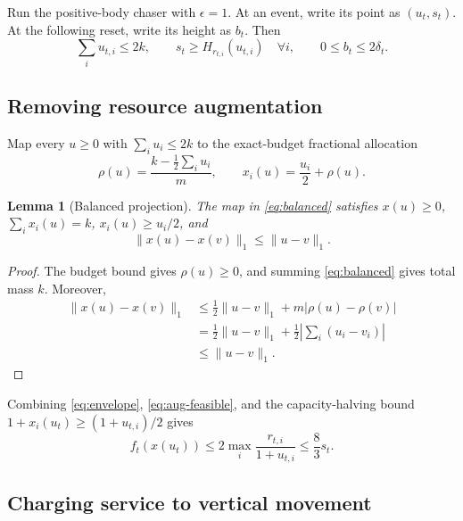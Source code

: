 \documentclass[11pt]{article}
\newtheorem{lemma}[theorem]{Lemma}
\theoremstyle{remark}
\begin{document}
Run the positive-body chaser with $\epsilon=1$.  At an event, write its point
as $(u_t,s_t)$.  At the following reset, write its height as $b_t$.  Then
\begin{equation}\label{eq:aug-feasible}
 \sum_i u_{t,i}\leq2k,\qquad s_t\geq H_{r_{t,i}}(u_{t,i})\quad\forall i,
 \qquad 0\leq b_t\leq2\delta_t.
\end{equation}

\subsection{Removing resource augmentation}

Map every $u\geq0$ with $\sum_i u_i\leq2k$ to the exact-budget fractional
allocation
\begin{equation}\label{eq:balanced}
 \rho(u)=\frac{k-\frac12\sum_i u_i}{m},
 \qquad x_i(u)=\frac{u_i}{2}+\rho(u).
\end{equation}

\begin{lemma}[Balanced projection]\label{lem:balanced}
The map in \eqref{eq:balanced} satisfies $x(u)\geq0$,
$\sum_i x_i(u)=k$, $x_i(u)\geq u_i/2$, and
\[
 \lVert x(u)-x(v)\rVert_1\leq\lVert u-v\rVert_1.
\]
\end{lemma}

\begin{proof}
The budget bound gives $\rho(u)\geq0$, and summing
\eqref{eq:balanced} gives total mass $k$.  Moreover,
\begin{align*}
 \lVert x(u)-x(v)\rVert_1
 &\leq\frac12\lVert u-v\rVert_1+m|\rho(u)-\rho(v)|\\
 &=\frac12\lVert u-v\rVert_1
   +\frac12\left|\sum_i(u_i-v_i)\right|\\
 &\leq\lVert u-v\rVert_1.
\end{align*}
\end{proof}

Combining \eqref{eq:envelope}, \eqref{eq:aug-feasible}, and the capacity-halving
bound $1+x_i(u_t)\geq(1+u_{t,i})/2$ gives
\begin{equation}\label{eq:service-height}
 f_t(x(u_t))
 \leq2\max_i\frac{r_{t,i}}{1+u_{t,i}}
 \leq\frac83s_t.
\end{equation}

\subsection{Charging service to vertical movement}
\end{document}
